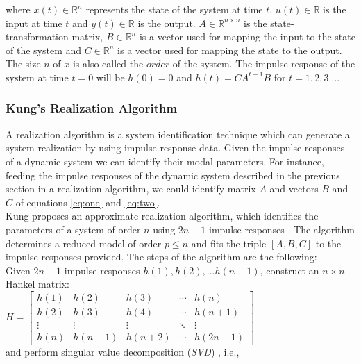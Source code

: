\documentclass[a4paper,11pt,twoside]{report}
\begin{document}
where $x(t) \in \mathbb{R}^n$ represents the state of the system at time $t$, $u(t) \in \mathbb{R}$ is the input at time $t$ and $y(t) \in \mathbb{R}$ is the output. $A \in \mathbb{R}^{n \times n} $ is the state-transformation matrix, $B \in \mathbb{R}^n$ is a vector used for mapping the input to the state of the system and $C \in \mathbb{R}^n$ is a vector used for mapping the state to the output. The size $n$ of $x$ is also called the $order$ of the system. The impulse response of the system at time $t=0$ will be $h(0)=0$ and $h(t)=CA^{t-1}B$ for $t=1,2,3\dots$.



\subsubsection{Kung's Realization Algorithm}
\label{sec:kung}

A realization algorithm is a system identification technique which can generate a system realization by using impulse response data. Given the impulse responses of a dynamic system we can identify their modal parameters. For instance, feeding the impulse responses of the dynamic system described in the previous section in a realization algorithm, we could identify matrix $A$ and vectors $B$ and $C$ of equations \ref{eq:one} and \ref{eq:two}.\\

\noindent Kung proposes an approximate realization algorithm, which identifies the parameters of a system of order $n$ using $2n-1$ impulse responses  \cite{1992040} \cite{1164997}. The algorithm determines a reduced model of order $p \le n$ and fits the triple $[A, B, C]$ to the impulse responses provided. The steps of the algorithm are the following: \\

Given $2n-1$ impulse responses $h(1), h(2), \dots h(n-1)$, construct an $n \times n$ Hankel matrix:\\

$H = \begin{bmatrix}
       h(1) & h(2) & h(3) & \cdots & h(n) \\
       h(2) & h(3) & h(4) & \cdots & h(n+1) \\
       \vdots & \vdots & \vdots & \ddots & \vdots \\
       h(n) & h(n+1) & h(n+2) & \cdots & h(2n-1)
     \end{bmatrix}
$\\

and perform singular value decomposition (\textit{SVD}) \cite{citeulike:2342309}, i.e.,
\end{document}
